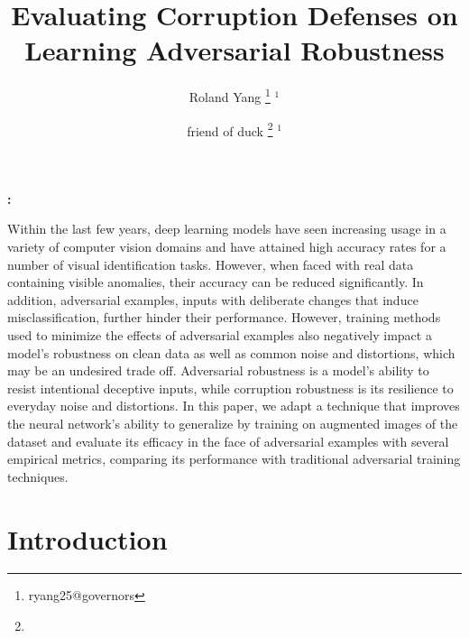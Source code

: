 \documentclass[a4paper]{article}
\title {Evaluating Corruption Defenses on Learning Adversarial Robustness}
\author{Roland Yang
\thanks{ryang25@governors} $^1$}
\author{friend of duck
\thanks{} $^1$}
\affil{$^1$ duck school}
\date{} %
\renewenvironment{abstract}{
    \begin{center}\begin{minipage}{14cm}{\textbf{\abstractname:}}
}
{
    \end{minipage}
    \end{center}
}
\newenvironment{keywords}{
    \def\abstractname{\emph{Keywords}}
    \begin{abstract}
}{\end{abstract}}
\begin{document}
\maketitle
\vspace{6pt}

\begin{abstract}
Within the last few years, deep learning models have seen increasing usage
in a variety of computer vision domains and have attained high accuracy rates
for a number of visual identification tasks. However, when faced with real data
containing visible anomalies, their accuracy can be reduced significantly. In
addition, adversarial examples, inputs with deliberate changes that induce
misclassification, further hinder their performance. However, training methods
used to minimize the effects of adversarial examples also negatively impact a
model's robustness on clean data as well as common noise and distortions, which
may be an undesired trade off. Adversarial robustness is a model’s ability to
resist intentional deceptive inputs, while corruption robustness is its
resilience to everyday noise and distortions. In this paper, we adapt a
technique that improves the neural network's ability to generalize by training
on augmented images of the dataset and evaluate its efficacy in the face of
adversarial examples with several empirical metrics, comparing its performance
with traditional adversarial training techniques.
\end{abstract}





\vspace{6pt}

\section{Introduction}
\end{document}
